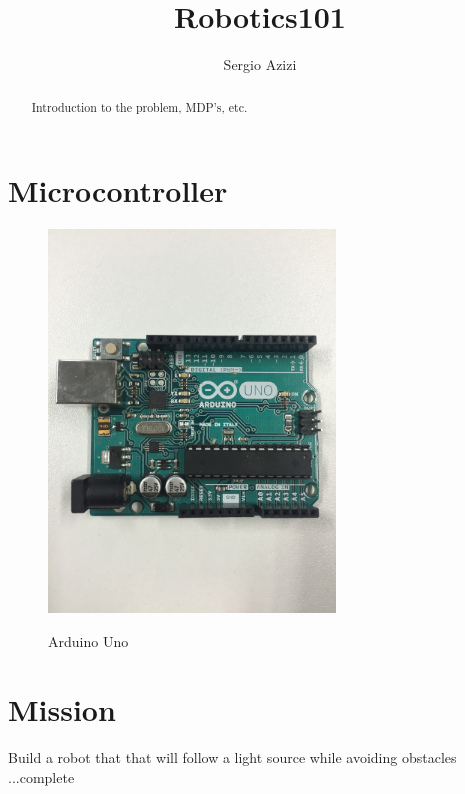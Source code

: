 \documentclass[final,3p,times,twocolumn]{elsarticle}
\begin{document}
\begin{frontmatter}

\title{Robotics101}

\author{Sergio Azizi}

\begin{abstract}
Introduction to the problem, MDP's, etc.
\end{abstract}

\end{frontmatter}

\section{Microcontroller}
\begin{figure}[h!]
\centering
\caption{Arduino Uno}
\includegraphics[trim={0 28cm 0 30cm}, clip, width=3in]{./media/microController.jpg}
\label{fig:MicroController}
\end{figure}

\section{Mission}
Build a robot that that will follow a light source while avoiding obstacles
...complete

\end{document}
